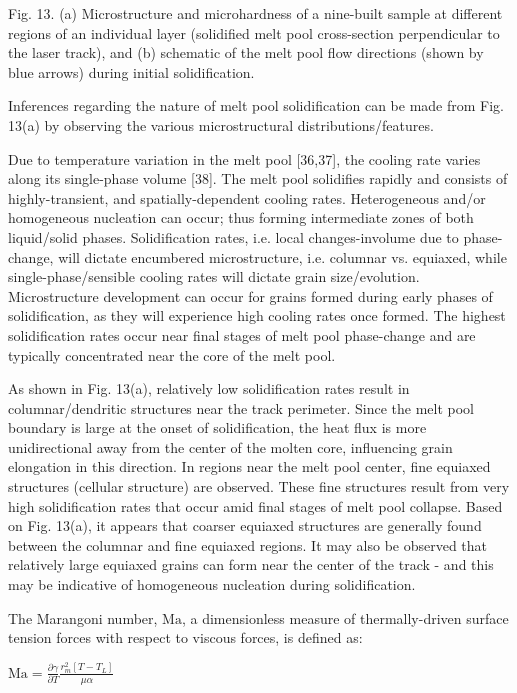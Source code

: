 \documentclass[10pt]{article}
\begin{document}
Fig. 13. (a) Microstructure and microhardness of a nine-built sample at different regions of an individual layer (solidified melt pool cross-section perpendicular to the laser track), and (b) schematic of the melt pool flow directions (shown by blue arrows) during initial solidification.

Inferences regarding the nature of melt pool solidification can be made from Fig. 13(a) by observing the various microstructural distributions/features.

Due to temperature variation in the melt pool [36,37], the cooling rate varies along its single-phase volume [38]. The melt pool solidifies rapidly and consists of highly-transient, and spatially-dependent cooling rates. Heterogeneous and/or homogeneous nucleation can occur; thus forming intermediate zones of both liquid/solid phases. Solidification rates, i.e. local changes-involume due to phase-change, will dictate encumbered microstructure, i.e. columnar vs. equiaxed, while single-phase/sensible cooling rates will dictate grain size/evolution. Microstructure development can occur for grains formed during early phases of solidification, as they will experience high cooling rates once formed. The highest solidification rates occur near final stages of melt pool phase-change and are typically concentrated near the core of the melt pool.

As shown in Fig. 13(a), relatively low solidification rates result in columnar/dendritic structures near the track perimeter. Since the melt pool boundary is large at the onset of solidification, the heat flux is more unidirectional away from the center of the molten core, influencing grain elongation in this direction. In regions near the melt pool center, fine equiaxed structures (cellular structure) are observed. These fine structures result from very high solidification rates that occur amid final stages of melt pool collapse. Based on Fig. 13(a), it appears that coarser equiaxed structures are generally found between the columnar and fine equiaxed regions. It may also be observed that relatively large equiaxed grains can form near the center of the track - and this may be indicative of homogeneous nucleation during solidification.

The Marangoni number, $\mathrm{Ma}$, a dimensionless measure of thermally-driven surface tension forces with respect to viscous forces, is defined as:

$\mathrm{Ma}=\frac{\partial \gamma}{\partial T} \frac{r_{m}^{2}\left[T-T_{L}\right]}{\mu \alpha}$
\end{document}
